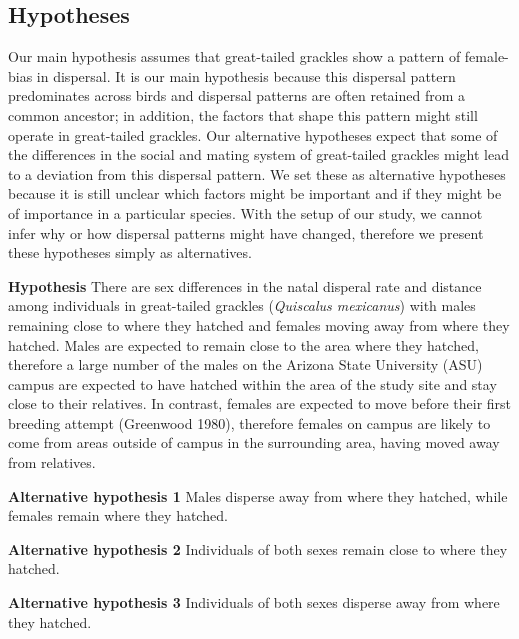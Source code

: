 \documentclass[
]{article}
\begin{document}
\hypertarget{hypotheses}{%
\subsection{Hypotheses}\label{hypotheses}}

Our main hypothesis assumes that great-tailed grackles show a pattern of
female-bias in dispersal. It is our main hypothesis because this
dispersal pattern predominates across birds and dispersal patterns are
often retained from a common ancestor; in addition, the factors that
shape this pattern might still operate in great-tailed grackles. Our
alternative hypotheses expect that some of the differences in the social
and mating system of great-tailed grackles might lead to a deviation
from this dispersal pattern. We set these as alternative hypotheses
because it is still unclear which factors might be important and if they
might be of importance in a particular species. With the setup of our
study, we cannot infer why or how dispersal patterns might have changed,
therefore we present these hypotheses simply as alternatives.

\textbf{Hypothesis} There are sex differences in the natal disperal rate
and distance among individuals in great-tailed grackles (\emph{Quiscalus
mexicanus}) with males remaining close to where they hatched and females
moving away from where they hatched. Males are expected to remain close
to the area where they hatched, therefore a large number of the males on
the Arizona State University (ASU) campus are expected to have hatched
within the area of the study site and stay close to their relatives. In
contrast, females are expected to move before their first breeding
attempt (Greenwood 1980), therefore females on campus are likely to come
from areas outside of campus in the surrounding area, having moved away
from relatives.

\textbf{Alternative hypothesis 1} Males disperse away from where they
hatched, while females remain where they hatched.

\textbf{Alternative hypothesis 2} Individuals of both sexes remain close
to where they hatched.

\textbf{Alternative hypothesis 3} Individuals of both sexes disperse
away from where they hatched.
\end{document}

